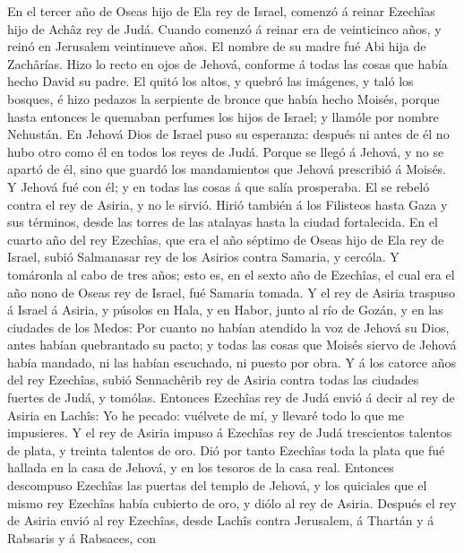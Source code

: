  En el tercer año de Oseas hijo de Ela rey de Israel,
comenzó á reinar Ezechîas hijo de Achâz rey de Judá.  Cuando
comenzó á reinar era de veinticinco años, y reinó en Jerusalem
veintinueve años. El nombre de su madre fué Abi hija de Zachârías.
 Hizo lo recto en ojos de Jehová, conforme á todas las cosas
que había hecho David su padre.  El quitó los altos, y
quebró las imágenes, y taló los bosques, é hizo pedazos la serpiente de
bronce que había hecho Moisés, porque hasta entonces le quemaban
perfumes los hijos de Israel; y llamóle por nombre Nehustán.
 En Jehová Dios de Israel puso su esperanza: después ni
antes de él no hubo otro como él en todos los reyes de Judá.
 Porque se llegó á Jehová, y no se apartó de él, sino que
guardó los mandamientos que Jehová prescribió á Moisés.  Y
Jehová fué con él; y en todas las cosas á que salía prosperaba. El se
rebeló contra el rey de Asiria, y no le sirvió.  Hirió
también á los Filisteos hasta Gaza y sus términos, desde las torres de
las atalayas hasta la ciudad fortalecida.  En el cuarto año
del rey Ezechîas, que era el año séptimo de Oseas hijo de Ela rey de
Israel, subió Salmanasar rey de los Asirios contra Samaria, y cercóla.
 Y tomáronla al cabo de tres años; esto es, en el sexto año
de Ezechîas, el cual era el año nono de Oseas rey de Israel, fué Samaria
tomada.  Y el rey de Asiria traspuso á Israel á Asiria, y
púsolos en Hala, y en Habor, junto al río de Gozán, y en las ciudades de
los Medos:  Por cuanto no habían atendido la voz de Jehová
su Dios, antes habían quebrantado su pacto; y todas las cosas que Moisés
siervo de Jehová había mandado, ni las habían escuchado, ni puesto por
obra.  Y á los catorce años del rey Ezechîas, subió
Sennachêrib rey de Asiria contra todas las ciudades fuertes de Judá, y
tomólas.  Entonces Ezechîas rey de Judá envió á decir al
rey de Asiria en Lachîs: Yo he pecado: vuélvete de mí, y llevaré todo lo
que me impusieres. Y el rey de Asiria impuso á Ezechîas rey de Judá
trescientos talentos de plata, y treinta talentos de oro. 
Dió por tanto Ezechîas toda la plata que fué hallada en la casa de
Jehová, y en los tesoros de la casa real.  Entonces
descompuso Ezechîas las puertas del templo de Jehová, y los quiciales
que el mismo rey Ezechîas había cubierto de oro, y diólo al rey de
Asiria.  Después el rey de Asiria envió al rey Ezechîas,
desde Lachîs contra Jerusalem, á Thartán y á Rabsaris y á Rabsaces, con
